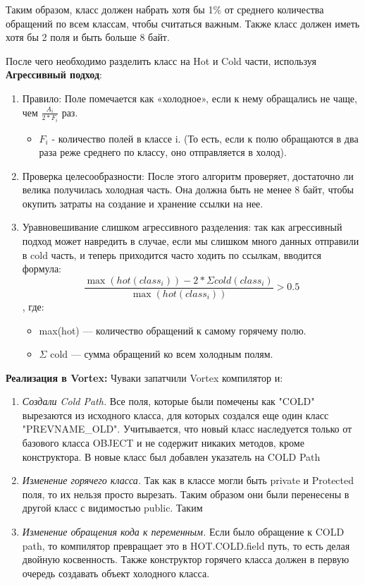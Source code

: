 \documentclass[a4paper,12pt]{article}
\begin{document}
Таким образом, класс должен набрать хотя бы 1\% от среднего количества обращений по всем 
классам, чтобы считаться важным. Также класс должен иметь хотя бы 2 поля и быть
больше 8 байт.

После чего необходимо разделить класс на Hot и Cold части, используя \textbf{Агрессивный 
подход}:
\begin{enumerate}
    \item Правило: Поле помечается как «холодное», если к нему обращались не чаще, чем 
        $\frac{A_i}{2 * F_i}$ раз. 
        \begin{itemize}
            \item $F_i$ - количество полей в классе i. (То есть, если к полю обращаются в
                            два раза реже среднего по классу, оно отправляется в холод).
        \end{itemize}
    \item Проверка целесообразности: После этого алгоритм проверяет, достаточно ли велика
        получилась холодная часть. Она должна быть не менее 8 байт, чтобы окупить 
        затраты на создание и хранение ссылки на нее.
    \item Уравновешивание слишком агрессивного разделения: так как агрессивный
        подход может навредить в случае, если мы слишком много данных отправили
        в cold часть, и теперь приходится часто ходить по ссылкам, вводится формула:
        \[
            \frac{\max(hot(class_i)) - 2 * \Sigma cold(class_i)}{\max(hot(class_i))} > 0.5
        \]
        , где:
        \begin{itemize}
            \item max(hot) — количество обращений к самому горячему полю.
            \item $\Sigma$ cold — сумма обращений ко всем холодным полям.
        \end{itemize}
\end{enumerate}


\textbf{Реализация в Vortex:}
Чуваки запатчили Vortex компилятор и:
\begin{enumerate}
    \item \textit{Создали Cold Path.} Все поля, которые были помечены как "COLD" 
         вырезаются из исходного класса, для которых создался еще один класс
        "PREVNAME\_OLD". Учитывается, что новый класс наследуется только от
        базового класса OBJECT и не содержит никаких методов, кроме
        конструктора. В новые класс был добавлен указатель на COLD Path
    \item \textit{Изменение горячего класса.} Так как в классе могли быть
        private и Protected поля, то их нельзя просто вырезать. Таким образом
        они были перенесены в другой класс с видимостью public. Таким 
    \item \textit{Изменение обращения кода к переменным.} Если было обращение к
        COLD path, то компилятор превращает это в HOT.COLD.field путь, то есть
        делая двойную косвенность. Также конструктор горячего класса должен в
        первую очередь создавать объект холодного класса.
\end{enumerate}
\end{document}
